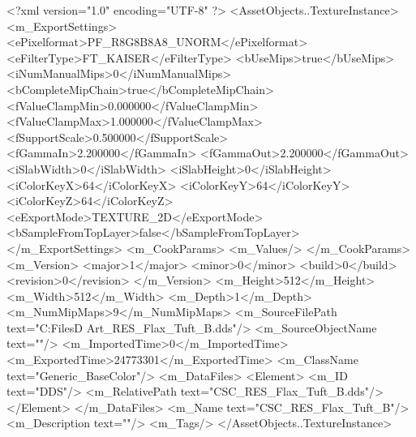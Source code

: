 <?xml version="1.0" encoding="UTF-8" ?>
<AssetObjects..TextureInstance>
	<m_ExportSettings>
		<ePixelformat>PF_R8G8B8A8_UNORM</ePixelformat>
		<eFilterType>FT_KAISER</eFilterType>
		<bUseMips>true</bUseMips>
		<iNumManualMips>0</iNumManualMips>
		<bCompleteMipChain>true</bCompleteMipChain>
		<fValueClampMin>0.000000</fValueClampMin>
		<fValueClampMax>1.000000</fValueClampMax>
		<fSupportScale>0.500000</fSupportScale>
		<fGammaIn>2.200000</fGammaIn>
		<fGammaOut>2.200000</fGammaOut>
		<iSlabWidth>0</iSlabWidth>
		<iSlabHeight>0</iSlabHeight>
		<iColorKeyX>64</iColorKeyX>
		<iColorKeyY>64</iColorKeyY>
		<iColorKeyZ>64</iColorKeyZ>
		<eExportMode>TEXTURE_2D</eExportMode>
		<bSampleFromTopLayer>false</bSampleFromTopLayer>
	</m_ExportSettings>
	<m_CookParams>
		<m_Values/>
	</m_CookParams>
	<m_Version>
		<major>1</major>
		<minor>0</minor>
		<build>0</build>
		<revision>0</revision>
	</m_Version>
	<m_Height>512</m_Height>
	<m_Width>512</m_Width>
	<m_Depth>1</m_Depth>
	<m_NumMipMaps>9</m_NumMipMaps>
	<m_SourceFilePath text="C:\Users\Shadow\Desktop\Working Files\3D Art\Resources\Flax\CSC_RES_Flax_Tuft_B.dds"/>
	<m_SourceObjectName text=""/>
	<m_ImportedTime>0</m_ImportedTime>
	<m_ExportedTime>24773301</m_ExportedTime>
	<m_ClassName text="Generic_BaseColor"/>
	<m_DataFiles>
		<Element>
			<m_ID text="DDS"/>
			<m_RelativePath text="CSC_RES_Flax_Tuft_B.dds"/>
		</Element>
	</m_DataFiles>
	<m_Name text="CSC_RES_Flax_Tuft_B"/>
	<m_Description text=""/>
	<m_Tags/>
</AssetObjects..TextureInstance>

